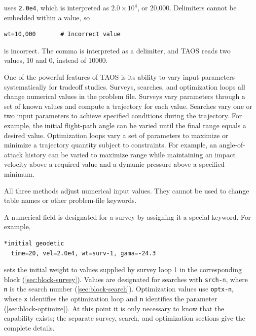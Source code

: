 uses \texttt{2.0e4}, which is interpreted as $2.0\times10^4$, or 20,000.
Delimiters cannot be embedded within a value, so

\begin{lstlisting}[style=taosmanual]
wt=10,000       # Incorrect value
\end{lstlisting}

is incorrect. The comma is interpreted as a delimiter, and TAOS reads two values,
10 and 0, instead of 10000.


One of the powerful features of TAOS is its ability to vary input parameters
systematically for tradeoff studies. Surveys, searches, and optimization loops all
change numerical values in the problem file. Surveys vary parameters through a set
of known values and compute a trajectory for each value. Searches vary one or two
input parameters to achieve specified conditions during the trajectory. For example,
the initial flight-path angle can be varied until the final range equals a desired value.
Optimization loops vary a set of parameters to maximize or minimize a trajectory
quantity subject to constraints. For example, an angle-of-attack history can be varied
to maximize range while maintaining an impact velocity above a required value and
a dynamic pressure above a specified minimum.

All three methods adjust numerical input values. They cannot be used to change
table names or other problem-file keywords.

A numerical field is designated for a survey by assigning it a special keyword. For
example,

\begin{lstlisting}[style=taosmanual]
*initial geodetic
  time=20, vel=2.0e4, wt=surv-1, gama=-24.3
\end{lstlisting}

sets the initial weight to values supplied by survey loop 1 in the corresponding
 block (\cref{sec:block-survey}). Values are designated for
searches with \texttt{srch-n}, where \texttt{n} is the search number
(\cref{sec:block-search}). Optimization values use \texttt{optx-n}, where
\texttt{x} identifies the optimization loop and \texttt{n} identifies the parameter
(\cref{sec:block-optimize}). At this point it is only necessary to know that the
capability exists; the separate survey, search, and optimization sections give the
complete details.

